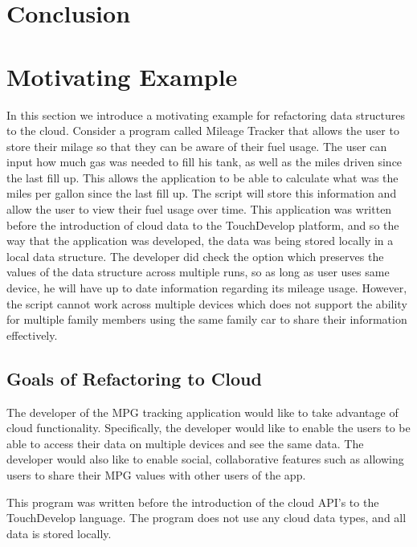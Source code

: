 \documentclass{sigplanconf}
\begin{document}
\section{Conclusion}



\section{Motivating Example}
\label{sec:motivatingExample}
In this section we introduce a motivating example for refactoring data structures to the cloud.   Consider a program called Mileage Tracker that allows the user to store their milage so that they can be aware of their fuel usage.  The user can input how much gas was needed to fill his tank, as well as the miles driven since the last fill up.  This allows the application to be able to calculate what was the miles per gallon since the last fill up.  The script will store this information and allow the user to view their fuel usage over time.  This application was written before the introduction of cloud data to the TouchDevelop platform, and so the way that the application was developed, the data was being stored locally in a local data structure.  The developer did check the option which preserves the values of the data structure across multiple runs, so as long as user uses same device, he will have up to date information regarding its mileage usage.  However, the script cannot work across multiple devices which does not support the ability for multiple family members using the same family car to share their information effectively.


\subsection{Goals of Refactoring to Cloud}
The developer of the MPG tracking application would like to take advantage of cloud functionality.  Specifically, the developer would like to enable the users to be able to access their data on multiple devices and see the same data. The developer would also like to enable social, collaborative features such as allowing users to share their MPG values with other users of the app.

This program was written before the introduction of the cloud API's to the TouchDevelop language.  The program does not use any cloud data types, and all data is stored locally.
\end{document}
